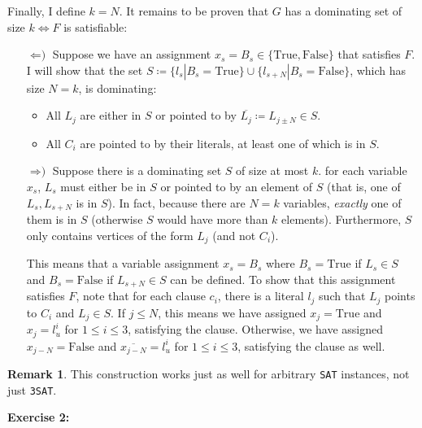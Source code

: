 \documentclass{amsart}
\theoremstyle{plain}
\theoremstyle{definition}
\newtheorem*{rk}{\textbf{Remark}}
\begin{document}
    Finally, I define $k = N$.
    It remains to be proven that $G$ has a dominating set of size $k \iff F$ is satisfiable:


    \begin{itemize}

        \item[$\Longleftarrow\text{)}$] Suppose we have an assignment $x_s = B_s \in \{\text{True}, \text{False}\}$
        that satisfies $F$.
        I will show that the set $S \coloneqq \{l_s | B_s = \text{True}\} \cup \{l_{s+N} | B_s = \text{False}\}$,
        which has size $N=k$, is dominating:
        \begin{itemize}
            \item All $L_j$ are either in $S$ or pointed to by $ \overline{L_j} \coloneqq L_{j \pm N} \in S$.
            \item All $C_i$ are pointed to by their literals, at least one of which is in $S$.
        \end{itemize}

        \item[$\Longrightarrow\text{)}$] Suppose there is a dominating set $S$ of size at most $k$.
        for each variable $x_s$, $L_s$ must either be in $S$ or pointed to by an element of $S$
        (that is, one of $L_s, L_{s+N}$ is in $S$). In fact, because there are $N=k$ variables,
        \emph{exactly} one of them is in $S$ (otherwise $S$ would have more than $k$ elements).
        Furthermore, $S$ only contains vertices of the form $L_j$ (and not $C_i$).

        This means that a variable assignment $x_s = B_s$ where $B_s = \text{True}$
        if $L_s \in S$ and $B_s = \text{False}$ if $L_{s+N} \in S$ can be defined.
        To show that this assignment satisfies $F$, note that for each clause $c_i$, there is
        a literal $l_j$ such that $L_j$ points to $C_i$ and $L_j \in S$.
        If $j \leq N$, this means we have assigned $x_j = \text{True}$ and $x_j = l^i_u$ for $1 \leq i \leq 3$,
        satisfying the clause.
        Otherwise, we have assigned $x_{j-N} = \text{False}$ and $\overline{x_{j-N}} = l^i_u$ for $1 \leq i \leq 3$,
        satisfying the clause as well.

    \end{itemize}

    \begin{rk}
        This construction works just as well for arbitrary \verb|SAT| instances, not just \verb|3SAT|.
    \end{rk}
    
    \textbf{Exercise 2:}

    ~\nocite{*}
    
    
\end{document}
